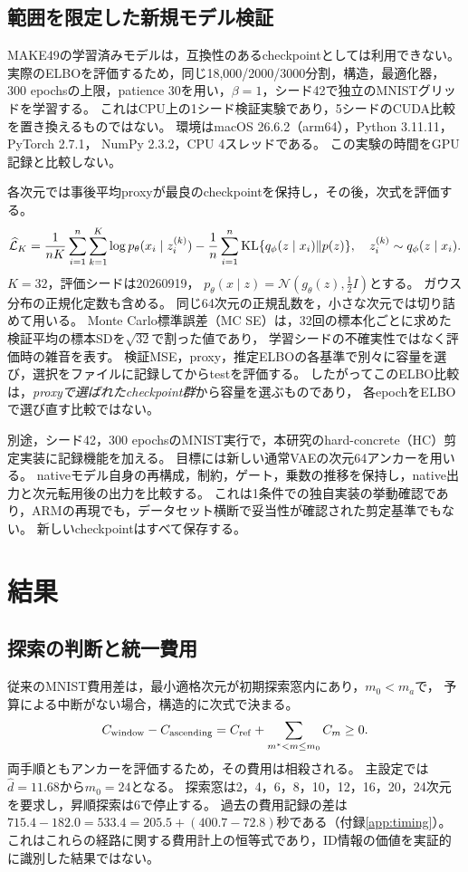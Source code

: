 \documentclass[11pt,a4paper]{ltjsarticle}
\begin{document}
\subsection{範囲を限定した新規モデル検証}\label{sec:newvalidation}
MAKE49の学習済みモデルは，互換性のあるcheckpointとしては利用できない。
実際のELBOを評価するため，同じ18,000/2000/3000分割，構造，最適化器，
300 epochsの上限，patience 30を用い，$\beta=1$，シード42で独立のMNISTグリッドを学習する。
これはCPU上の1シード検証実験であり，5シードのCUDA比較を置き換えるものではない。
環境はmacOS 26.6.2（arm64），Python 3.11.11，PyTorch 2.7.1，
NumPy 2.3.2，CPU 4スレッドである。
この実験の時間をGPU記録と比較しない。

各次元では事後平均proxyが最良のcheckpointを保持し，その後，次式を評価する。
\begin{equation}
 \widehat{\mathcal L}_K
 =\frac{1}{nK}\sum_{i=1}^n\sum_{k=1}^K
 \log p_\theta(x_i\mid z_i^{(k)})
 -\frac1n\sum_{i=1}^n
 {\rm KL}\{q_\phi(z\mid x_i)\Vert p(z)\},\quad
 z_i^{(k)}\sim q_\phi(z\mid x_i).
 \label{eq:mc}
\end{equation}
$K=32$，評価シードは20260919，
$p_\theta(x\mid z)=\mathcal N(g_\theta(z),\tfrac12 I)$とする。
ガウス分布の正規化定数も含める。
同じ64次元の正規乱数を，小さな次元では切り詰めて用いる。
Monte Carlo標準誤差（MC SE）は，32回の標本化ごとに求めた検証平均の標本SDを$\sqrt{32}$で割った値であり，
学習シードの不確実性ではなく評価時の雑音を表す。
検証MSE，proxy，推定ELBOの各基準で別々に容量を選び，選択をファイルに記録してからtestを評価する。
したがってこのELBO比較は，\emph{proxyで選ばれたcheckpoint群}から容量を選ぶものであり，
各epochをELBOで選び直す比較ではない。

別途，シード42，300 epochsのMNIST実行で，本研究のhard-concrete（HC）剪定実装に記録機能を加える。
目標には新しい通常VAEの次元64アンカーを用いる。
nativeモデル自身の再構成，制約，ゲート，乗数の推移を保持し，native出力と次元転用後の出力を比較する。
これは1条件での独自実装の挙動確認であり，ARMの再現でも，データセット横断で妥当性が確認された剪定基準でもない。
新しいcheckpointはすべて保存する。

\section{結果}\label{sec:results}

\subsection{探索の判断と統一費用}\label{sec:replayresults}
従来のMNIST費用差は，最小適格次元が初期探索窓内にあり，$m_0<m_a$で，
予算による中断がない場合，構造的に次式で決まる。
\begin{equation}
 C_{\rm window}-C_{\rm ascending}
 =C_{\rm ref}+\sum_{m^*<m\le m_0}C_m\ge0.
 \label{eq:dominance}
\end{equation}
両手順ともアンカーを評価するため，その費用は相殺される。
主設定では$\hat d=11.68$から$m_0=24$となる。
探索窓は2，4，6，8，10，12，16，20，24次元を要求し，昇順探索は6で停止する。
過去の費用記録の差は$715.4-182.0=533.4=205.5+(400.7-72.8)$秒である（付録\ref{app:timing}）。
これはこれらの経路に関する費用計上の恒等式であり，ID情報の価値を実証的に識別した結果ではない。
\end{document}
